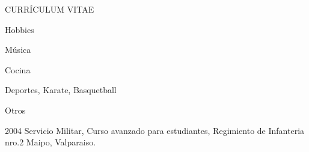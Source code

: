 \documentclass{article}
\begin{document}
\begin{cv}{CURR\'ICULUM VITAE}
\begin{cvlist}{Hobbies}
\item M\'usica
\item Cocina
\item Deportes, Karate, Basquetball
\end{cvlist}

\begin{cvlist}{Otros}
\item[2004] Servicio Militar, Curso avanzado para estudiantes, Regimiento de Infanteria nro.2 Maipo, Valparaiso.
\end{cvlist}

\vspace{2cm}
\end{cv}
\end{document}
